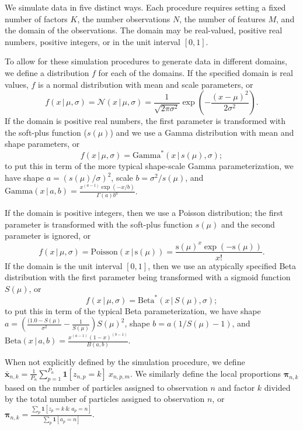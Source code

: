 \documentclass[twoside,11pt]{article}
\newcommand{\g}{\, | \,}
\begin{document}
We simulate data in five distinct ways.  Each procedure requires setting a fixed number of factors $K$, the number observations $N$, the number of features $M$, and the domain of the observations.
The domain may be real-valued, positive real numbers, positive integers, or in the unit interval $[0,1]$. 

To allow for these simulation procedures to generate data in different domains, we define a distribution $f$ for each of the domains.  If the specified domain is real values, $f$ is a normal distribution with mean and scale parameters, or 
\begin{equation}
    f(x \g \mu, \sigma) = \mathcal{N}(x \g \mu, \sigma) = \frac{1}{\sqrt{2\pi \sigma^2}} \exp\left(-\frac{(x-\mu)^2}{2\sigma^2}\right).
\end{equation}
If the domain is positive real numbers, the first parameter is transformed with the soft-plus function ($s(\mu)$) and we use a Gamma distribution with mean and shape parameters, or
\begin{equation}
    f(x \g \mu, \sigma) = \mbox{Gamma}^*(x \g s(\mu), \sigma);
\end{equation}
to put this in term of the more typical shape-scale Gamma parameterization, we have shape $a=(s(\mu)/\sigma)^2$,  scale $b=\sigma^2 / s(\mu)$, and $\mbox{Gamma}(x \g a, b) = \frac{x^{(a-1)}\exp(-x/b)}{\Gamma(a)b^a}$.

If the domain is positive integers, then we use a Poisson distribution; the first parameter is transformed with the soft-plus function $s(\mu)$ and the second parameter is ignored, or
\begin{equation}
    f(x \g \mu, \sigma) = \mbox{Poisson}(x \g \mbox{s}(\mu)) = \frac{\mbox{s}(\mu)^x \exp\left(-\mbox{s}(\mu)\right)}{x!}.
\end{equation}
If the domain is the unit interval $[0,1]$, then we use an atypically specified Beta distribution with the first parameter being transformed with a sigmoid function $S(\mu)$, or
\begin{equation}
    f(x \g \mu, \sigma) = \mbox{Beta}^*(x \g S(\mu), \sigma);
\end{equation}
to put this in term of the typical Beta parameterization, we have shape $a=\left(\frac{(1.0-S(\mu)}{\sigma^2} - \frac{1}{S(\mu)}\right) S(\mu)^2$,  shape $b=a \left(1/S(\mu) - 1\right)$, and $\mbox{Beta}(x \g a, b) = \frac{x^{(a-1)}(1-x)^{(b-1)}}{B(a,b)}$.

When not explicitly defined by the simulation procedure, we define $\boldsymbol{\bar{x}}_{n,k} = \frac{1}{P_n} \sum_{p=1}^{P_n} \boldsymbol{1}[z_{n,p}=k] ~x_{n,p,m}$. We similarly define the local proportions $\boldsymbol{\pi}_{n,k}$ based on the number of particles assigned to observation $n$ and factor $k$ divided by the total number of particles assigned to observation $n$, or $\boldsymbol{\pi}_{n,k} = \frac{\sum_{p} \boldsymbol{1}[z_p = k ~\&~ a_p = n]}{\sum_{p} \boldsymbol{1}[a_p = n]}$.
\end{document}
